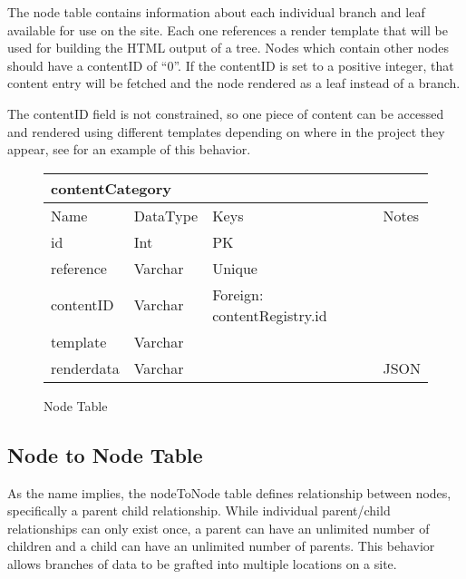 \documentclass[]{book}
\begin{document}
The node table contains information about each individual branch and leaf available for use on the site.  Each one references a render template that will be used for building the HTML output of a tree. Nodes which contain other nodes should have a contentID of \enquote{0}. If the contentID is set to a positive integer, that content entry will be fetched and the node rendered as a leaf instead of a branch.

The contentID field is not constrained, so one piece of content can be accessed and rendered using different templates depending on where in the project they appear, see  for an example of this behavior.

\begin{figure}[H]
	\centering
	\caption{Node Table}
	\vspace{12pt}
	\begin{tabular}{ |p{1.25in}|p{.75in}|p{2in}|p{1in}| }
		\hline
		\multicolumn{4}{|l|}{\textbf{contentCategory}} \\
		\hline
		\hline
		Name & DataType & Keys & Notes\\
		\hline
		id & Int & PK & \\
		reference & Varchar & Unique & \\
		contentID & Varchar & Foreign: contentRegistry.id & \\
		template & Varchar & & \\
		renderdata & Varchar & & JSON \\
		\hline
	\end{tabular}
\end{figure}

\subsection{Node to Node Table}

As the name implies, the nodeToNode table defines relationship between nodes, specifically a parent child relationship. While individual parent/child relationships can only exist once, a parent can have an unlimited number of children and a child can have an unlimited number of parents. This behavior allows branches of data to be grafted into multiple locations on a site.
\end{document}

